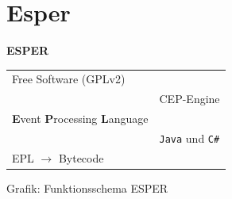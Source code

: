 \documentclass{beamer}
\begin{document}
\section{Esper}
\begin{frame}{}
\begin{center}
    \Large \textbf{ESPER}
\end{center}

\vspace*{1cm}

\begin{tabular}{ll}
    Free Software (GPLv2) \hspace{3cm}   &\\
                            &CEP-Engine \\
    \hspace{2cm}\textbf{E}vent \textbf{P}rocessing \textbf{L}anguage & \\
                            &\hspace{2cm}\texttt{Java} und \texttt{C\#} \\ 
    \hspace{1cm}EPL $\rightarrow$ Bytecode&\\
\end{tabular}
\end{frame}


\begin{frame}
    Grafik: Funktionsschema ESPER
\end{frame}


        
\end{document}
